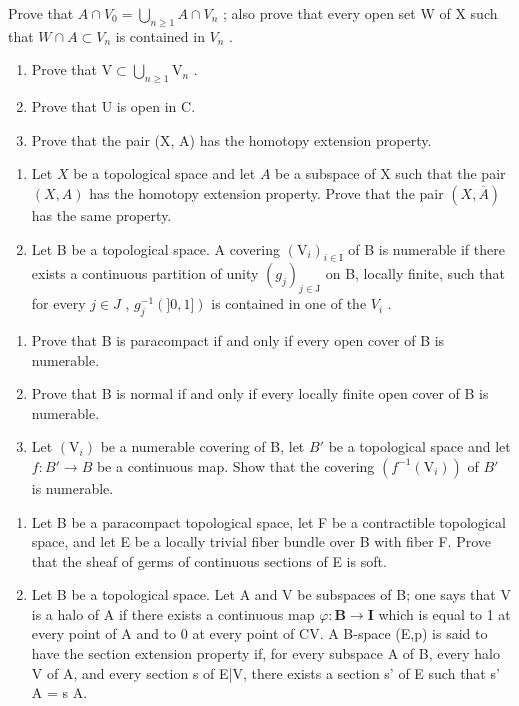 Prove that \(A \cap V_{0} = \bigcup_{n \geqslant 1} A \cap V_{n}\) ; also prove that every open set W of X such that \(W \cap A \subset V_{n}\) is contained in \(V_{n}\) .

\begin{enumerate}
\def\labelenumi{\alph{enumi})}
\setcounter{enumi}{1}
\item
  Prove that \(\mathrm{V} \subset \bigcup_{n \geqslant 1} \mathrm{V}_n\) .
\item
  Prove that U is open in C.
\item
  Prove that the pair (X, A) has the homotopy extension property.
\end{enumerate}

\begin{enumerate}
\def\labelenumi{\arabic{enumi})}
\setcounter{enumi}{27}
\item
  Let \(X\) be a topological space and let \(A\) be a subspace of X such that the pair \((X, A)\) has the homotopy extension property. Prove that the pair \((X, \overline{A})\) has the same property.
\item
  Let B be a topological space. A covering \((\mathrm{V}_{i})_{i\in\mathrm{I}}\) of B is numerable if there exists a continuous partition of unity \((g_{j})_{j\in\mathrm{J}}\) on B, locally finite, such that for every \(j\in J\) , \(g_{j}^{-1}(]0,1])\) is contained in one of the \(V_{i}\) .
\end{enumerate}

\begin{enumerate}
\def\labelenumi{\alph{enumi})}
\item
  Prove that B is paracompact if and only if every open cover of B is numerable.
\item
  Prove that B is normal if and only if every locally finite open cover of B is numerable.
\item
  Let \((\mathrm{V}_{i})\) be a numerable covering of B, let \(B'\) be a topological space and let \(f: B' \to B\) be a continuous map. Show that the covering \((f^{-1}(\mathrm{V}_{i}))\) of \(B'\) is numerable.
\end{enumerate}

\begin{enumerate}
\def\labelenumi{\arabic{enumi})}
\setcounter{enumi}{29}
\item
  Let B be a paracompact topological space, let F be a contractible topological space, and let E be a locally trivial fiber bundle over B with fiber F. Prove that the sheaf of germs of continuous sections of E is soft.
\item
  Let B be a topological space. Let A and V be subspaces of B; one says that V is a halo of A if there exists a continuous map \(\varphi\colon\mathbf{B}\to\mathbf{I}\) which is equal to 1 at every point of A and to 0 at every point of CV. A B-space (E,p) is said to have the section extension property if, for every subspace A of B, every halo V of A, and every section s of E|V, there exists a section s' of E such that s' \textbar{} A = s \textbar{} A.
\end{enumerate}

